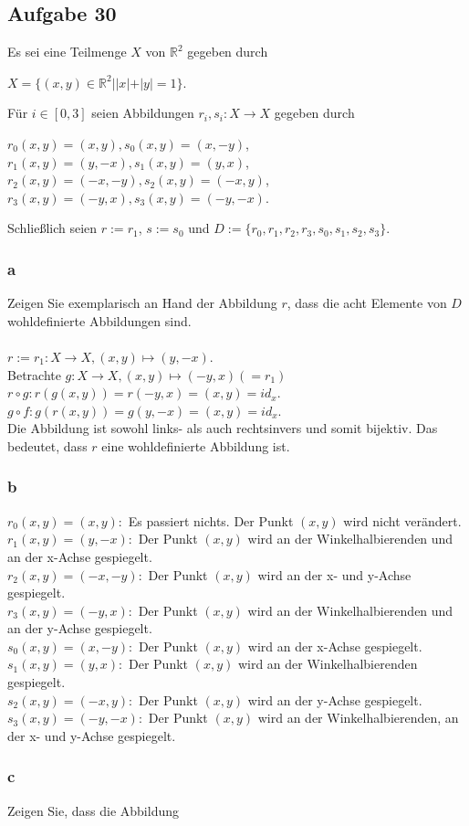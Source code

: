 \documentclass[a4paper,graphics,11pt]{article}
\newcommand\aufgabe[1]{\subsection*{Aufgabe #1}}
\newcommand\aufgabenteil[1]{\subsubsection*{#1}}
\begin{document}
\aufgabe{30}
Es sei eine Teilmenge $X$ von $\mathbb{R}^{2}$ gegeben durch 
\begin{center}
$X = \{(x,y) \in \mathbb{R}^{2} | |x|+ |y| = 1\}$.
\end{center}
F{\"u}r $i \in [0,3]$ seien Abbildungen $r_{i},s_{i}: X \to X$ gegeben durch
\begin{center}
$r_{0}(x,y) = (x,y), s_{0}(x,y) = (x,-y)$,\\
$r_{1}(x,y) = (y,-x), s_{1}(x,y) = (y,x)$,\\
$r_{2}(x,y) = (-x,-y), s_{2}(x,y) = (-x,y)$,\\
$r_{3}(x,y) = (-y,x), s_{3}(x,y) = (-y,-x)$.
\end{center}
Schlie{\ss}lich seien $r:=r_{1}$, $s:=s_{0}$ und $D:=\{r_{0}, r_{1}, r_{2}, r_{3}, s_{0}, s_{1}, s_{2}, s_{3}\}$.
\aufgabenteil{a}
Zeigen Sie exemplarisch an Hand der Abbildung $r$, dass die acht Elemente von $D$ wohldefinierte Abbildungen sind. \\ \\
$r:=r_{1}:X \to X, (x,y) \mapsto (y,-x)$.\\
Betrachte $g:X \to X, (x,y) \mapsto (-y,x)$\hfill $(=r_{1})$\\
$r\circ g: r(g(x,y)) = r(-y,x) = (x,y) = id_{x}$.\\
$g\circ f: g(r(x,y)) = g(y,-x) = (x,y) = id_{x}$.\\
Die Abbildung ist sowohl links- als auch rechtsinvers und somit bijektiv. Das bedeutet, dass $r$ eine wohldefinierte Abbildung ist.
\aufgabenteil{b}
$r_{0}(x,y)=(x,y):$ Es passiert nichts. Der Punkt $(x,y)$ wird nicht ver{\"a}ndert.\\
$r_{1}(x,y)=(y,-x):$ Der Punkt $(x,y)$ wird an der Winkelhalbierenden und an der x-Achse gespiegelt.\\
$r_{2}(x,y)=(-x,-y):$ Der Punkt $(x,y)$ wird an der x- und y-Achse gespiegelt.\\
$r_{3}(x,y)=(-y,x):$ Der Punkt $(x,y)$ wird an der Winkelhalbierenden und an der y-Achse gespiegelt.\\
$s_{0}(x,y)=(x,-y):$ Der Punkt $(x,y)$ wird an der x-Achse gespiegelt.\\
$s_{1}(x,y)=(y,x):$ Der Punkt $(x,y)$ wird an der Winkelhalbierenden gespiegelt.\\
$s_{2}(x,y)=(-x,y):$ Der Punkt $(x,y)$ wird an der y-Achse gespiegelt.\\
$s_{3}(x,y)=(-y,-x):$ Der Punkt $(x,y)$ wird an der Winkelhalbierenden, an der x- und y-Achse gespiegelt.
\aufgabenteil{c}
Zeigen Sie, dass die Abbildung
\end{document}
